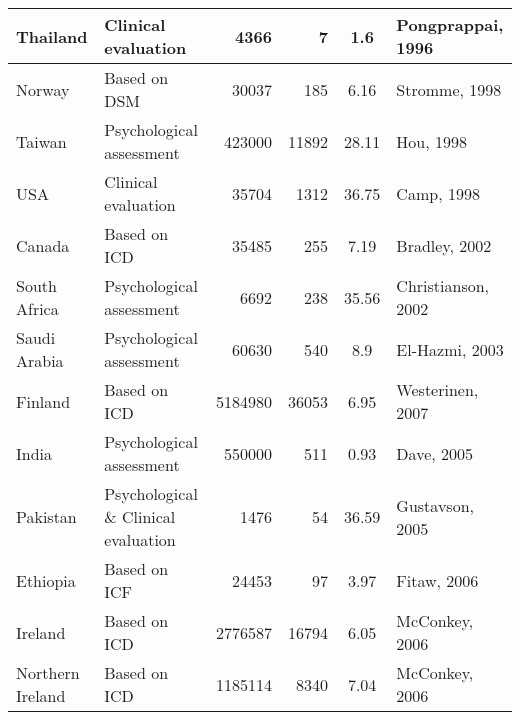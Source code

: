 \begin{spacing}{0.65}
\begin{longtable}{l p{1in} r r S l}
	Thailand         & Clinical evaluation                  & 4366                & 7                  & 1.6                        & Pongprappai, 1996  \\* \midrule
	Norway           & Based on DSM                         & 30037               & 185                & 6.16                       & Stromme, 1998      \\* \midrule
	Taiwan           & Psychological assessment             & 423000              & 11892              & 28.11                      & Hou, 1998          \\* \midrule
	USA              & Clinical evaluation                  & 35704               & 1312               & 36.75                      & Camp, 1998         \\* \midrule
	Canada           & Based on ICD                         & 35485               & 255                & 7.19                       & Bradley, 2002      \\* \midrule
	South Africa     & Psychological assessment             & 6692                & 238                & 35.56                      & Christianson, 2002 \\* \midrule
	Saudi Arabia     & Psychological assessment             & 60630               & 540                & 8.9                        & El-Hazmi, 2003     \\* \midrule
	Finland          & Based on ICD                         & 5184980             & 36053              & 6.95                       & Westerinen, 2007   \\* \midrule
	India            & Psychological assessment             & 550000              & 511                & 0.93                       & Dave, 2005         \\* \midrule
	Pakistan         & Psychological \& Clinical evaluation & 1476                & 54                 & 36.59                      & Gustavson, 2005    \\* \midrule
	Ethiopia         & Based on ICF                         & 24453               & 97                 & 3.97                       & Fitaw, 2006        \\* \midrule
	Ireland          & Based on ICD                         & 2776587             & 16794              & 6.05                       & McConkey, 2006     \\* \midrule
	Northern Ireland & Based on ICD                         & 1185114             & 8340               & 7.04                       & McConkey, 2006     \\* \midrule

\end{longtable}
\end{spacing}
